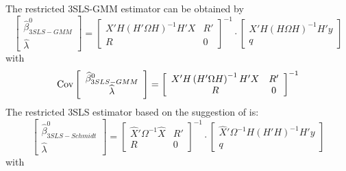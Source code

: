 The restricted 3SLS-GMM estimator can be obtained by
\begin{equation}
   \left[ \begin{array}{c}
      \widehat{\beta}^0_{3SLS-GMM} \\ \widehat{\lambda}
   \end{array} \right]
   =
   \left[ \begin{array}{cc}
      X' H \left( H' \Omega H \right)^{-1} H' X & R' \\ 
      R & 0
   \end{array} \right]^{-1}
   \cdot
   \left[ \begin{array}{c}
      X' H \left( H \Omega H \right)^{-1} H' y \\ q 
   \end{array} \right]
   \label{eq:3slsGmmR}
\end{equation}
with
\begin{equation}
   \text{Cov} 
   \left[ \begin{array}{c}
      \widehat{\beta}^0_{3SLS-GMM} \\ \widehat{\lambda}
   \end{array} \right] 
   = 
   \left[ \begin{array}{cc}
      X' H \left( H' \Omega H \right)^{-1} H' X & R' \\ 
      R & 0
   \end{array} \right]^{-1}
\end{equation}
The restricted 3SLS estimator based on the suggestion of
\cite{schmidt90} is:
\begin{equation}
   \left[ \begin{array}{c}
      \widehat{\beta}^0_{3SLS-Schmidt} \\ \widehat{\lambda}
   \end{array} \right]
   =
   \left[ \begin{array}{cc}
      \widehat{X}' \Omega^{-1} \widehat{X} & R' \\ 
      R & 0
   \end{array} \right]^{-1}
   \cdot
   \left[ \begin{array}{c}
      \widehat{X}' \Omega^{-1} H \left( H' H \right)^{-1} H' y \\ q 
   \end{array} \right]
   \label{eq:3slsSchmidtR}
\end{equation}
with
